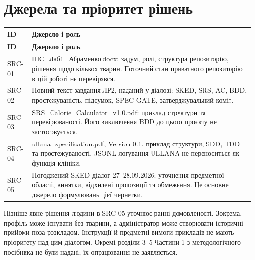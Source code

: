 \documentclass[11pt,a4paper]{article}
\begin{document}
\section{Джерела та пріоритет рішень}
\begin{longtable}{>{\raggedright\arraybackslash}p{2cm} >{\raggedright\arraybackslash}p{13.6cm}}
\toprule
\textbf{ID} & \textbf{Джерело і роль} \\ \midrule
\endfirsthead
\toprule
\textbf{ID} & \textbf{Джерело і роль} \\ \midrule
\endhead
\bottomrule
\endfoot
SRC-01 & ПІС\_Лаб1\_Абраменко.docx: задум, ролі, структура репозиторію, рішення щодо кількох тварин. Поточний стан приватного репозиторію в цій роботі не перевірявся. \\
SRC-02 & Повний текст завдання ЛР2, наданий у діалозі: SKED, SRS, AC, BDD, простежуваність, підсумок, SPEC-GATE, затверджувальний коміт. \\
SRC-03 & SRS\_Calorie\_Calculator\_v1.0.pdf: приклад структури та перевірюваності. Його виключення BDD до цього проєкту не застосовується. \\
SRC-04 & ullana\_specification.pdf, Version 0.1: приклад структури, SDD, TDD та простежуваності. JSONL-логування ULLANA не переноситься як функція клініки. \\
SRC-05 & Погоджений SKED-діалог 27–28.09.2026: уточнення предметної області, винятки, відхилені пропозиції та обмеження. Це основне джерело формулювань цієї чернетки. \\
\end{longtable}

Пізніше явне рішення людини в SRC-05 уточнює ранні домовленості. Зокрема, профіль може існувати без тварини, а адміністратор може створювати історичні прийоми поза розкладом. Інструкції й предметні вимоги прикладів не мають пріоритету над цим діалогом. Окремі розділи 3–5 Частини 1 з методологічного посібника не були надані; їх опрацювання не заявляється.
\end{document}
